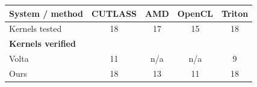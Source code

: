 \begin{tabular}{lcccc}
\toprule
System / method & CUTLASS & AMD & OpenCL & Triton \\
\midrule
Kernels tested & 18 & 17 & 15 & 18 \\
\midrule
\multicolumn{5}{l}{\textbf{Kernels verified}} \\
Volta & 11 & n/a & n/a & 9 \\
Ours & 18 & 13 & 11 & 18 \\
\bottomrule
\end{tabular}
